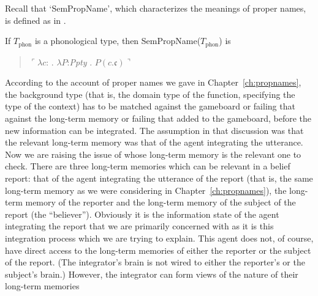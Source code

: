 Recall that `SemPropName', which characterizes the meanings of proper
names, is defined as in \nexteg{}.
\begin{ex}
  If $T_{\text{phon}}$ is a phonological type, then SemPropName($T_{\text{phon}}$) is
  \begin{quote}
    $\ulcorner\lambda c$:  . $\lambda
    P$:\textit{Ppty} . $P(c.\mathfrak{c})\urcorner$
  \end{quote}
                 
\end{ex} 
According to the account of proper names we gave in Chapter~\ref{ch:propnames}, the
background type (that is, the domain type of the function, specifying
the type of the context) has to be matched against the gameboard or
failing that against the long-term memory or failing that added to the gameboard,
before the new information can be integrated.  The assumption in that
discussion was that the relevant long-term memory was that of the
agent integrating the utterance. Now we are raising the issue of whose
long-term memory is the relevant one to check.  There are three
long-term memories which can be relevant in a belief report: that of
the agent integrating the utterance of the report (that is, the same
long-term memory as we were considering in
Chapter~\ref{ch:propnames}), the long-term memory of the reporter and
the long-term memory of the subject of the report (the ``believer'').
Obviously it is the information state of the agent integrating the
report that we are primarily concerned with as it is this integration
process which we are trying to explain.  This agent does not, of
course, have direct access to the long-term memories of either the
reporter or the subject of the report.  (The integrator's brain is not
wired to either the reporter's or the subject's brain.)  However, the
integrator can form views of the nature of their long-term memories
